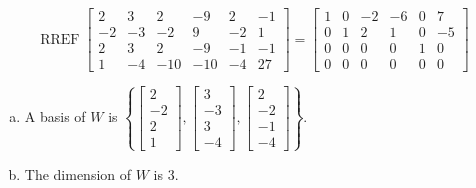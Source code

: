 \begin{exerciseAnswer} 


\[\operatorname{RREF} \left[\begin{array}{cccccc}
2 & 3 & 2 & -9 & 2 & -1 \\
-2 & -3 & -2 & 9 & -2 & 1 \\
2 & 3 & 2 & -9 & -1 & -1 \\
1 & -4 & -10 & -10 & -4 & 27
\end{array}\right] = \left[\begin{array}{cccccc}
1 & 0 & -2 & -6 & 0 & 7 \\
0 & 1 & 2 & 1 & 0 & -5 \\
0 & 0 & 0 & 0 & 1 & 0 \\
0 & 0 & 0 & 0 & 0 & 0
\end{array}\right] \]


\begin{enumerate}[(a)]
\item A basis of \(W\) is \( \left\{ \left[\begin{array}{c}
2 \\
-2 \\
2 \\
1
\end{array}\right] , \left[\begin{array}{c}
3 \\
-3 \\
3 \\
-4
\end{array}\right] , \left[\begin{array}{c}
2 \\
-2 \\
-1 \\
-4
\end{array}\right] \right\} \).
\item The dimension of \(W\) is \( 3 \).
\end{enumerate}
    
\end{exerciseAnswer}
    
